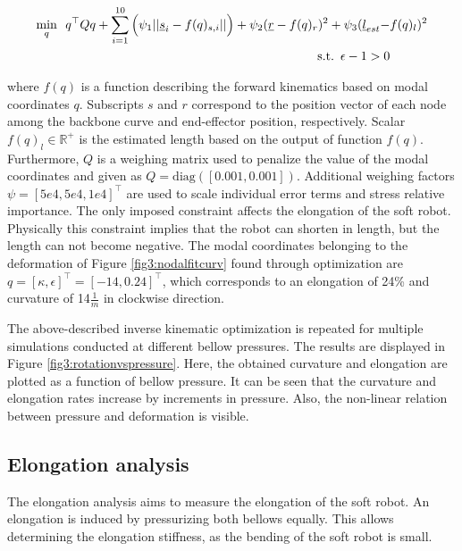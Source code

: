 \begin{equation}
\begin{aligned}
\min_{q} \hspace{5pt}  q^\top Q q  + \sum_{i=1}^{10}\Big(\psi_1 ||\text{\underbar{$s$}}_{i} - f(q)_{s,i}|| \Big) +   \psi_2(\text{\underbar{$r$}}  - f(q)_{r})^2 +  \psi_3(\text{\underbar{$l$}}_{est} - & f(q)_l)^2  \\ 
\text{s.t.} \hspace{5pt} \epsilon - 1 > 0
\end{aligned}
\label{eq3:optim}
\end{equation}


where $f(q)$ is a function describing the forward kinematics based on modal coordinates $q$. Subscripts $s$ and $r$ correspond to the position vector of each node among the backbone curve and end-effector position, respectively. Scalar $f(q)_l \in \mathbb{R}^+$ is the estimated length based on the output of function $f(q)$. Furthermore, $Q$ is a weighing matrix used to penalize the value of the modal coordinates and given as $ Q = \text{diag}([0.001,0.001])$. Additional weighing factors $\psi = [5e4,5e4,1e4]^\top$ are used to scale individual error terms and stress relative importance. The only imposed constraint affects the elongation of the soft robot. Physically this constraint implies that the robot can shorten in length, but the length can not become negative. The modal coordinates belonging to the deformation of Figure \ref{fig3:nodalfitcurv} found through optimization are $q = [\kappa,\epsilon]^\top = [-14,0.24]^\top$, which corresponds to an elongation of 24\% and curvature of 14$\frac{1}{m}$ in clockwise direction.


The above-described inverse kinematic optimization is repeated for multiple simulations conducted at different bellow pressures. The results are displayed in Figure \ref{fig3:rotationvspressure}. Here, the obtained curvature and elongation are plotted as a function of bellow pressure. It can be seen that the curvature and elongation rates increase by increments in pressure. Also, the non-linear relation between pressure and deformation is visible.




\subsection{Elongation analysis}
\label{subsecelong}


The elongation analysis aims to measure the elongation of the soft robot. An elongation is induced by pressurizing both bellows equally. This allows determining the elongation stiffness, as the bending of the soft robot is small.

